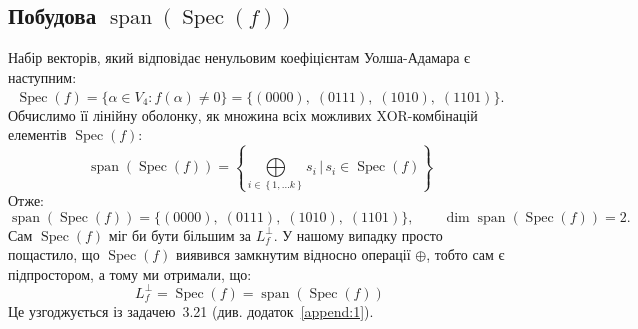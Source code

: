 \subsection{Побудова \texorpdfstring{$\operatorname{span}(\operatorname{Spec}(f))$}{span}}
Набір векторів, який відповідає ненульовим коефіцієнтам Уолша-Адамара є наступним:
\begin{equation*}
    \operatorname{Spec}(f) = \{\alpha \in V_{4} : \hat{f}(\alpha) \neq 0\}
    = \{(0000),\; (0111),\; (1010),\; (1101)\}.
\end{equation*}
Обчислимо її лінійну оболонку, як множина всіх можливих XOR-комбінацій елементів $\operatorname{Spec}(f)$:
\begin{equation*}
    \operatorname{span}(\operatorname{Spec}(f)) = 
    \left\{\bigoplus\limits_{i \in \left\{1, \dots k\right\}} s_{i} \, \bigg| \, s_{i} \in \operatorname{Spec}(f)\right\}
\end{equation*}
Отже:
\begin{equation*}
    \operatorname{span}(\operatorname{Spec}(f)) = \{(0000),\; (0111),\; (1010),\; (1101)\},
    \qquad \dim \operatorname{span}(\operatorname{Spec}(f)) = 2.
\end{equation*}
Сам $\operatorname{Spec}(f)$ міг би бути більшим за $L_{f}^{\perp}$. У нашому випадку просто пощастило, що 
$\operatorname{Spec}(f)$ виявився замкнутим відносно операції $\oplus$, тобто сам є підпростором, а тому ми 
отримали, що:
\begin{equation*}
    L_{f}^{\perp} = \operatorname{Spec}(f) = \operatorname{span}(\operatorname{Spec}(f))
\end{equation*}
Це узгоджується із задачею~3.21 (див. додаток~\ref{append:1}).

